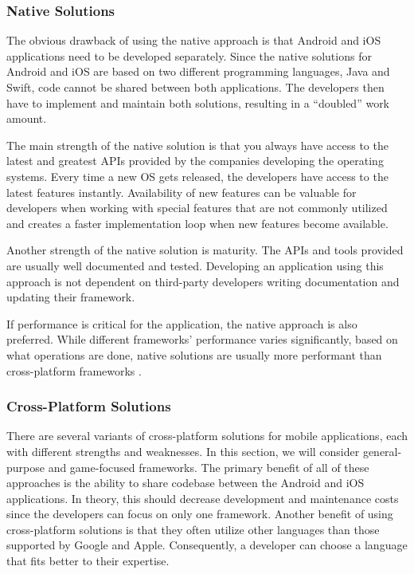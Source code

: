 \subsubsection{Native Solutions}
The obvious drawback of using the native approach is that Android and iOS applications need to be developed separately. Since the native solutions for Android and iOS are based on two different programming languages, Java and Swift, code cannot be shared between both applications. The developers then have to implement and maintain both solutions, resulting in a “doubled” work amount.

The main strength of the native solution is that you always have access to the latest and greatest APIs provided by the companies developing the operating systems. Every time a new OS gets released, the developers have access to the latest features instantly. Availability of new features can be valuable for developers when working with special features that are not commonly utilized and creates a faster implementation loop when new features become available.

Another strength of the native solution is maturity. The APIs and tools provided are usually well documented and tested. Developing an application using this approach is not dependent on third-party developers writing documentation and updating their framework. 

If performance is critical for the application, the native approach is also preferred. While different frameworks’ performance varies significantly, based on what operations are done, native solutions are usually more performant than cross-platform frameworks \citep{biorn-hansen_empirical_2020}.

\subsubsection{Cross-Platform Solutions}
There are several variants of cross-platform solutions for mobile applications, each with different strengths and weaknesses. In this section, we will consider general-purpose and game-focused frameworks. The primary benefit of all of these approaches is the ability to share codebase between the Android and iOS applications. In theory, this should decrease development and maintenance costs since the developers can focus on only one framework. Another benefit of using cross-platform solutions is that they often utilize other languages than those supported by Google and Apple. Consequently, a developer can choose a language that fits better to their expertise.

